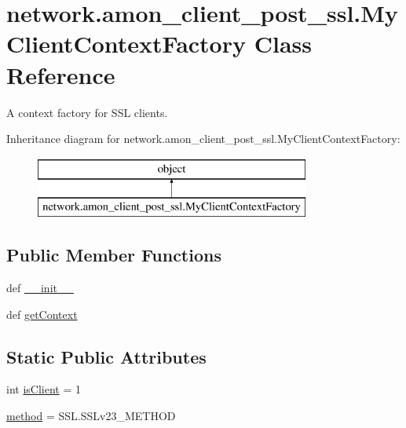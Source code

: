 \hypertarget{classnetwork_1_1amon__client__post__ssl_1_1_my_client_context_factory}{\section{network.\-amon\-\_\-client\-\_\-post\-\_\-ssl.\-My\-Client\-Context\-Factory Class Reference}
\label{classnetwork_1_1amon__client__post__ssl_1_1_my_client_context_factory}
}


A context factory for S\-S\-L clients.  


Inheritance diagram for network.\-amon\-\_\-client\-\_\-post\-\_\-ssl.\-My\-Client\-Context\-Factory\-:\begin{figure}[H]
\begin{center}
\leavevmode
\includegraphics[height=2.000000cm]{d3/d78/classnetwork_1_1amon__client__post__ssl_1_1_my_client_context_factory}
\end{center}
\end{figure}
\subsection*{Public Member Functions}
\begin{DoxyCompactItemize}
\item 
def \hyperlink{classnetwork_1_1amon__client__post__ssl_1_1_my_client_context_factory_afe44ae2cb3a60bcb486b8f9a062161a7}{\-\_\-\-\_\-init\-\_\-\-\_\-}
\item 
def \hyperlink{classnetwork_1_1amon__client__post__ssl_1_1_my_client_context_factory_a69d76fc8ad67fd62836594c2d054d391}{get\-Context}
\end{DoxyCompactItemize}
\subsection*{Static Public Attributes}
\begin{DoxyCompactItemize}
\item 
int \hyperlink{classnetwork_1_1amon__client__post__ssl_1_1_my_client_context_factory_aa08daa1615e946f030df695c5797852a}{is\-Client} = 1
\item 
\hyperlink{classnetwork_1_1amon__client__post__ssl_1_1_my_client_context_factory_ae250225a1c80aaaa42e24ab2212695a2}{method} = S\-S\-L.\-S\-S\-Lv23\-\_\-\-M\-E\-T\-H\-O\-D
\end{DoxyCompactItemize}


